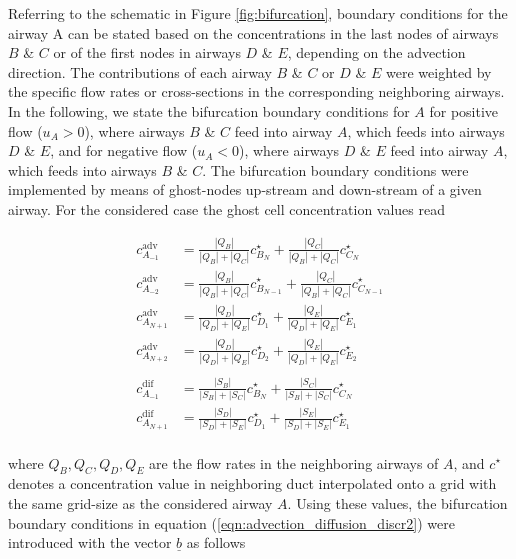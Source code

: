 Referring to the schematic in Figure \ref{fig:bifurcation}, boundary conditions for the airway A can be stated based on the concentrations in the last nodes of airways $B$ \& $C$ or of the first nodes in airways $D$ \& $E$, depending on the advection direction.
The contributions of each airway $B$ \& $C$ or $D$ \& $E$ were weighted by the specific flow rates or cross-sections in the corresponding neighboring airways.
In the following, we state the bifurcation boundary conditions for $A$ for positive flow ($u_A>0$), where airways $B$ \& $C$ feed into airway $A$, which feeds into airways $D$ \& $E$, and for negative flow ($u_A<0$), where airways $D$ \& $E$ feed into airway $A$, which feeds into airways $B$ \& $C$.
The bifurcation boundary conditions were implemented by means of ghost-nodes up-stream and down-stream of a given airway.
For the considered case the ghost cell concentration values read

\begin{equation}
\begin{split}
c_{A_{-1}}^\mathrm{adv}  &= \frac{|Q_B|}{|Q_B| + |Q_C|}c_{B_{N}}^\star + \frac{|Q_C|}{|Q_B| + |Q_C|}c_{C_{N}}^\star \\
c_{A_{-2}}^\mathrm{adv}  &= \frac{|Q_B|}{|Q_B| + |Q_C|}c_{B_{N-1}}^\star + \frac{|Q_C|}{|Q_B| + |Q_C|}c_{C_{N-1}}^\star \\
c_{A_{N+1}}^\mathrm{adv} &= \frac{|Q_D|}{|Q_D| + |Q_E|}c_{D_{1}}^\star + \frac{|Q_E|}{|Q_D| + |Q_E|}c_{E_{1}}^\star \\
c_{A_{N+2}}^\mathrm{adv} &= \frac{|Q_D|}{|Q_D| + |Q_E|}c_{D_{2}}^\star + \frac{|Q_E|}{|Q_D| + |Q_E|}c_{E_{2}}^\star \\
\\
c_{A_{-1}}^\mathrm{dif}  &= \frac{|S_B|}{|S_B| + |S_C|}c_{B_{N}}^\star + \frac{|S_C|}{|S_B| + |S_C|}c_{C_{N}}^\star \\
c_{A_{N+1}}^\mathrm{dif} &= \frac{|S_D|}{|S_D| + |S_E|}c_{D_{1}}^\star + \frac{|S_E|}{|S_D| + |S_E|}c_{E_{1}}^\star \\
\end{split}
\end{equation}

where $Q_B, Q_C, Q_D, Q_E$ are the flow rates in the neighboring airways of $A$, and $c^\star$ denotes a concentration value in neighboring duct interpolated onto a grid with the same grid-size as the considered airway $A$.
Using these values, the bifurcation boundary conditions in equation (\ref{eqn:advection_diffusion_discr2}) were introduced with the vector $\underline{b}$ as follows


